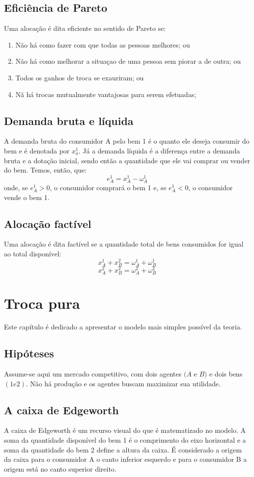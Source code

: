 \documentclass[oneside,12pt, letterpaper]{book}
\begin{document}
\section{Efici{\^e}ncia de Pareto}
Uma aloca{\c c}{\~ a}o {\'e} dita eficiente no sentido de Pareto se:
\begin{enumerate}
\item N{\~ a}o h{\'a} como fazer com que todas as pessoas melhores; ou
\item N{\~ a}o h{\'a} como melhorar a situa{\c c}ao de uma pessoa sem piorar a de outra; ou
\item Todos os ganhos de troca se exauriram; ou
\item N{\~a} h{\'a} trocas mutualmente vantajosas para serem efetuadas; 
\end{enumerate}

\section{Demanda bruta e l{\'i}quida}
A demanda bruta do consumidor A pelo bem 1 {\'e} o quanto ele deseja consumir do bem e {\'e} denotada por $ x^1_a $. J{\' a} a demanda l{\' i}quida {\' e} a diferen{\c c}a entre
a demanda bruta e a dota{\c c}{\~a}o inicial, sendo ent{\~a}o a quantidade que ele vai comprar ou vender do bem. Temos, ent{\~a}o, que:
\[e^1_A = x^1_A - \omega^1_A \] onde, se $e^1_A > 0$, o consumidor comprar{\'a} o bem 1 e, se $e^1_A < 0$, o consumidor vende o bem 1.
\section{Aloca{\c c}{\~a}o fact{\'i}vel}
Uma aloca{\c c}{\~a}o {\'e} dita fact{\'i}vel se a quantidade total de bens consumidos for igual ao total dispon{\'i}vel: \[x^1_A + x^2_B = \omega^1_A + \omega^1_B \] \[x^2_A + x^2_B = \omega^2_A + \omega^2_B \]
\chapter{Troca pura}
Este cap{\'i}tulo {\'e} dedicado a apresentar o modelo mais simples poss{\'i}vel da teoria.
\section{Hip{\'o}teses}
Assume-se aqui um mercado competitivo, com dois agentes $(A$  e  $ B)$ e dois bens $(1 e 2)$. N{\~a}o h{\'a} produ{\c c}{\~a}o e os agentes buscam maximizar sua utilidade.

\section{A caixa de Edgeworth}
A caixa de Edgeworth {\'e} um recurso visual do que {\'e} matematizado no modelo. A soma da quantidade dispon{\'i}vel do bem 1 {\'e} o comprimento do eixo
horizontal e a soma da quantidade do bem 2 define a altura da caixa. {\'E} considerado a origem da caixa para o consumidor A o canto inferior esquerdo e 
para o consumidor B a origem est{\'a} no canto superior direito. 
\end{document}
